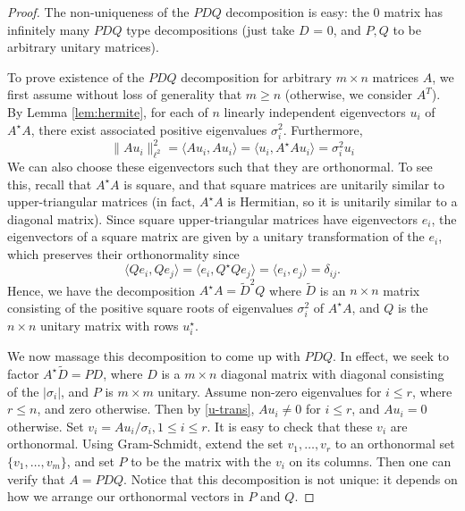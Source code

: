 \documentclass[12pt]{article}
\theoremstyle{plain}
\theoremstyle{definition}
\theoremstyle{remark}
\numberwithin{equation}{section}  %
\begin{document}
\begin{proof}
The non-uniqueness of the $PDQ$ decomposition is easy: the $0$ matrix has
infinitely many $PDQ$ type decompositions (just take $D$ = 0, and $P, Q$ to be
arbitrary unitary matrices).

To prove existence of the $PDQ$ decomposition for arbitrary $m \times n$ matrices $A$, we
first assume without loss of generality that $m \ge n$ (otherwise, we consider $A^T$).
By Lemma \ref{lem:hermite}, for each of $n$ linearly independent eigenvectors
$u_i$ of $A^{\star}A$, there exist associated positive eigenvalues $\sigma_i^2$.
Furthermore,
\begin{equation}
\label{u-trans}
\| A u_i \|_{\ell^2}^2 = \langle Au_i, Au_i \rangle  = \langle u_i, A^{\star}A
u_i \rangle = \sigma_i^{2} u_i
\end{equation}
We can also choose these eigenvectors such that they are orthonormal. To see
this, recall that $A^{\star}A$ is square, and that square matrices
are unitarily similar to upper-triangular matrices (in fact, $A^\star A$ is
Hermitian, so it is unitarily similar to a diagonal matrix).
Since square upper-triangular matrices have eigenvectors $e_i$, the eigenvectors
of a square matrix are given by a unitary transformation of the $e_i$,
which preserves their orthonormality since
\begin{equation*}
\langle Q e_i, Qe_j \rangle  = \langle e_i, Q^{\star}Q e_j \rangle  = \langle
e_i, e_j \rangle  = \delta_{ij}.
\end{equation*}
Hence, we have the decomposition $A^{\star}A = \tilde{D}^{2}Q$ where $\tilde{D}$ is an $n \times n$
matrix consisting of the positive square roots of eigenvalues $\sigma_i^2$ of
$A^{\star}A$, and $Q$ is the $n \times n$ unitary matrix with rows
$u_i^{\star}$. 
 
We now massage this decomposition to come up with $PDQ$. In effect, we seek to
factor $A^{\star}\tilde{D} = PD$, where $D$ is a $m \times n$ diagonal matrix
with diagonal consisting of the $ |\sigma_i|$, and $P$ is $m \times m$ unitary. 
Assume non-zero eigenvalues for $i \le r$, where $r \le n$, and zero otherwise.
Then by \eqref{u-trans}, $A u_i \neq 0$ for $i \le r$, and $A u_i = 0$ otherwise.
Set $v_i = Au_i/\sigma_i, 1 \le i \le r$. It is easy to check that these $v_i$ are orthonormal.
Using Gram-Schmidt, extend the set ${v_1, \ldots, v_r}$ to an orthonormal set
$\{v_1, \ldots, v_m \}$, and set $P$ to be the matrix with the $v_i$ on its columns.
Then one can verify that $A = PDQ$. Notice that this decomposition is not unique: it depends on how we
arrange our orthonormal vectors in $P$ and $Q$. 
\end{proof}
\end{document}
